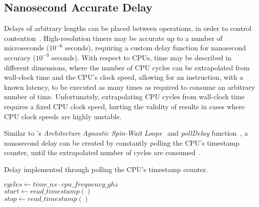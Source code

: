 \subsection{Nanosecond Accurate Delay}
Delays of arbitrary lengths can be placed between operations, in order to
control contention~\citep{valois1994queues}. High-resolution timers may be accurate up
to a number of microseconds ($10^{-6}$ seconds), requiring a custom delay
function for nanosecond accuracy ($10^{-9}$ seconds). With respect to CPUs,
time may be described in different dimensions,
where the number of CPU cycles can be extrapolated from wall-clock time and the
CPU's clock speed, allowing for an instruction, with a known latency, to be
executed as many times as required to consume an arbitrary number of
time. Unfortunately, extrapolating CPU cycles from wall-clock time
requires a fixed CPU clock speed, hurting the validity of results in cases
where CPU clock speeds are highly unstable.


Similar to \citeauthor{intel2018spinloop}'s
\emph{Architecture Agnostic Spin-Wait Loops}~\citep{intel2018spinloop} and
\emph{pollDelay} function~\citep[Example~2.3]{intelmanualoptimization}, a
nanosecond delay can be created by constantly polling the CPU's timestamp
counter, until the extrapolated number of cycles are
consumed~\cite{ramalhete2019delay}.


\begin{algorithm}
    \caption{Delay implemented through polling the CPU's timestamp counter.}\label{alg:delay}
            $cycles \gets time\_ns \cdot cpu\_frequency\_ghz$ \\
            $start \gets read\_timestamp()$ \\
            {
                $stop \gets read\_timestamp()$
            }
\end{algorithm}

